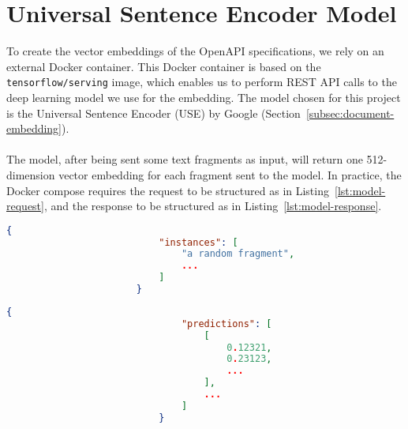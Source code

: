 \section{Universal Sentence Encoder Model}\label{sec:use-model}

To create the vector embeddings of the OpenAPI specifications, we rely on an external Docker container.
This Docker container is based on the \verb|tensorflow/serving| image, which enables us to perform REST API calls to the deep learning model we use for the embedding.
The model chosen for this project is the Universal Sentence Encoder (USE) by Google (Section~\ref{subsec:document-embedding}). \\ \\
The model, after being sent some text fragments as input, will return one 512-dimension vector embedding for each fragment sent to the model.
In practice, the Docker compose requires the request to be structured as in Listing~\ref{lst:model-request}, and the response to be structured as in Listing~\ref{lst:model-response}.

\begin{center}
    \begin{lstlisting}[label={lst:model-request},language=json,caption={Example of request body sent to the model},captionpos=b]
                       {
                           "instances": [
                               "a random fragment",
                               ...
                           ]
                       }
    \end{lstlisting}
\end{center}

\begin{center}
    \begin{lstlisting}[label={lst:model-response},language=json,caption={Example of response body sent to the model},captionpos=b]
                           {
                               "predictions": [
                                   [
                                       0.12321,
                                       0.23123,
                                       ...
                                   ],
                                   ...
                               ]
                           }
    \end{lstlisting}
\end{center}
